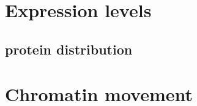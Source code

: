 \section{Expression levels}




    \subsection{protein distribution}


\section{Chromatin movement}




